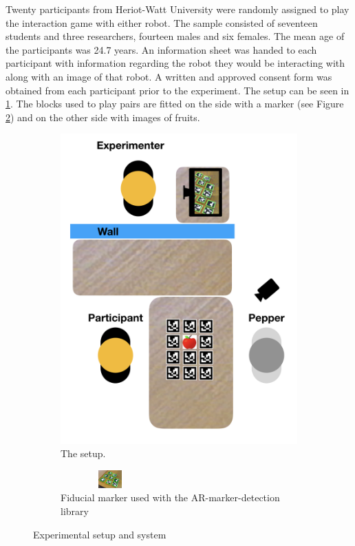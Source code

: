 \documentclass[letterpaper]{article} %
\begin{document}
Twenty participants from Heriot-Watt University were randomly assigned to play the interaction game with either robot. The sample consisted of seventeen students and three researchers, fourteen males and six females. The mean age of the participants was 24.7 years. An information sheet was handed to each participant with information regarding the robot they would be interacting with along with an image of that robot. A written and approved consent form was obtained from each participant prior to the experiment.
The setup can be seen in \ref{pic2}. The blocks used to play pairs are fitted on the side with a marker (see Figure \ref{pic3}) and on the other side with images of fruits.
\begin{figure}
\centering
\begin{subfigure}[b]{0.27\textwidth}
\includegraphics[width=\textwidth]{Picture4.png}
\caption{The setup.}
\label{pic2}
\end{subfigure}
\vspace{-4.23mm}
\begin{subfigure}[b]{0.12\textwidth}
\includegraphics[width=0.42\textwidth,height=0.27in ]{Picture3.png}
\caption{Fiducial marker used with the AR-marker-detection library}
\label{pic3}
\end{subfigure}
\caption{Experimental setup and system}\label{fig:animals}
\end{figure}
\end{document}

